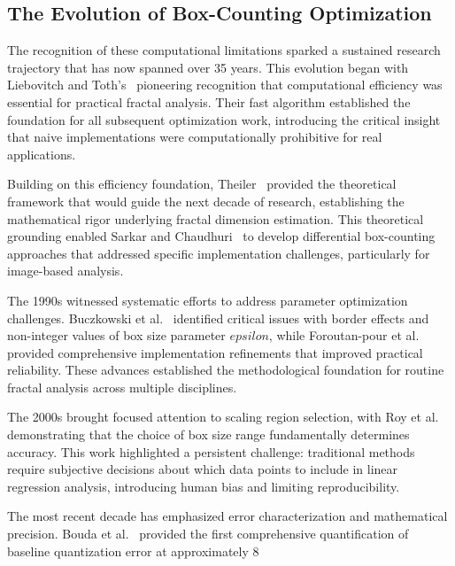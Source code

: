 \documentclass[preprint,12pt]{elsarticle}
\def\epsilon{epsilon}%
\begin{document}
\subsection{The Evolution of Box-Counting Optimization}

The recognition of these computational limitations sparked a sustained research trajectory that has now spanned over 35 years. This evolution began with Liebovitch and Toth's~\cite{liebovitch1989} pioneering recognition that computational efficiency was essential for practical fractal analysis. Their fast algorithm established the foundation for all subsequent optimization work, introducing the critical insight that naive implementations were computationally prohibitive for real applications.

Building on this efficiency foundation, Theiler~\cite{theiler1990} provided the theoretical framework that would guide the next decade of research, establishing the mathematical rigor underlying fractal dimension estimation. This theoretical grounding enabled Sarkar and Chaudhuri~\cite{sarkar1994} to develop differential box-counting approaches that addressed specific implementation challenges, particularly for image-based analysis.

The 1990s witnessed systematic efforts to address parameter optimization challenges. Buczkowski et al.~\cite{buczkowski1998} identified critical issues with border effects and non-integer values of box size parameter $\epsilon$, while Foroutan-pour et al.~\cite{foroutan1999} provided comprehensive implementation refinements that improved practical reliability. These advances established the methodological foundation for routine fractal analysis across multiple disciplines.

The 2000s brought focused attention to scaling region selection, with Roy et al.~\cite{roy2007} demonstrating that the choice of box size range fundamentally determines accuracy. This work highlighted a persistent challenge: traditional methods require subjective decisions about which data points to include in linear regression analysis, introducing human bias and limiting reproducibility.

The most recent decade has emphasized error characterization and mathematical precision. Bouda et al.~\cite{bouda2016} provided the first comprehensive quantification of baseline quantization error at approximately 8%
\end{document}
